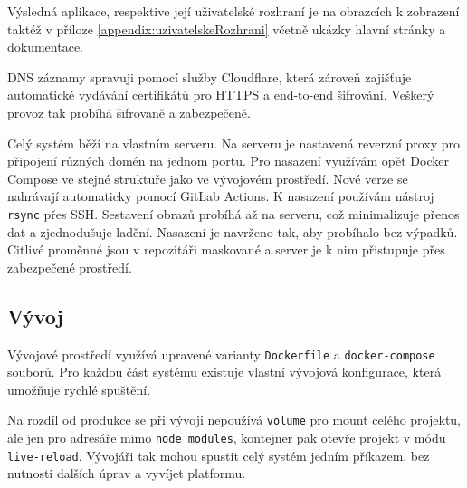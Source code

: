 Výsledná aplikace, respektive její uživatelské rozhraní je na obrazcích k zobrazení taktéž v příloze \ref{appendix:uzivatelskeRozhrani} včetně ukázky hlavní stránky a dokumentace.

DNS záznamy spravuji pomocí služby Cloudflare, která zároveň zajišťuje automatické vydávání certifikátů pro HTTPS a end-to-end šifrování. 
Veškerý provoz tak probíhá šifrovaně a zabezpečeně.

Celý systém běží na vlastním serveru. 
Na serveru je nastavená reverzní proxy pro připojení různých domén na jednom portu.
Pro nasazení využívám opět Docker Compose ve stejné struktuře jako ve vývojovém prostředí.
Nové verze se nahrávají automaticky pomocí GitLab Actions. 
K nasazení používám nástroj \texttt{rsync} přes SSH. 
Sestavení obrazů probíhá až na serveru, což minimalizuje přenos dat a zjednodušuje ladění. 
Nasazení je navrženo tak, aby probíhalo bez výpadků. 
Citlivé proměnné jsou v repozitáři maskované a server je k nim přistupuje přes zabezpečené prostředí.

\subsection{Vývoj}

Vývojové prostředí využívá upravené varianty \texttt{Dockerfile} a \texttt{docker-compose} souborů. Pro každou část systému existuje vlastní vývojová konfigurace, která umožňuje rychlé spuštění.

Na rozdíl od produkce se při vývoji nepoužívá \texttt{volume} pro mount celého projektu, ale jen pro adresáře mimo \texttt{node\_modules}, kontejner pak otevře projekt v módu \texttt{live-reload}.
Vývojáři tak mohou spustit celý systém jedním příkazem, bez nutnosti dalších úprav a vyvíjet platformu.




